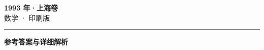 \documentclass[zihao=5, a4paper]{ctexart}
\begin{document}
\begin{center}
  {\Large\bfseries 1993 年·上海卷}\\[4pt]
  {\large 数学 · 印刷版}
\end{center}
\medskip
{}

\par\bigskip\hrule\bigskip
{}
\begin{center}{\large\bfseries 参考答案与详细解析}\end{center}
\smallskip

\end{document}
